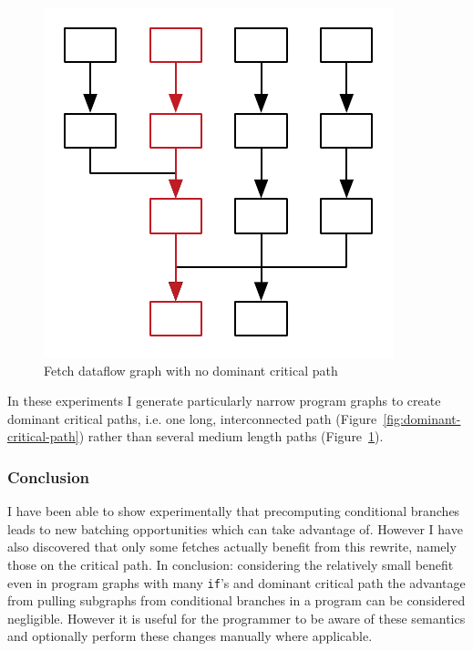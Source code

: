 \begin{figure}
  \includegraphics[width=.5\textwidth]{../Figures/non-dominant-critical-path}
  \caption{Fetch dataflow graph with no dominant critical path}
  \label{fig:non-dominant-critical-path}
\end{figure}

In these experiments I generate particularly narrow program graphs to create dominant critical paths, i.e. one long, interconnected path (Figure~\ref{fig:dominant-critical-path}) rather than several medium length paths (Figure~\ref{fig:non-dominant-critical-path}).

\subsubsection{Conclusion}

I have been able to show experimentally that precomputing conditional branches leads to new batching opportunities which \yauhau{} can take advantage of.
However I have also discovered that only some fetches actually benefit from this rewrite, namely those on the critical path.
In conclusion: considering the relatively small benefit even in program graphs with many \texttt{if}'s and dominant critical path the advantage from pulling subgraphs from conditional branches in a program can be considered negligible.
However it is useful for the programmer to be aware of these semantics and optionally perform these changes manually where applicable.
